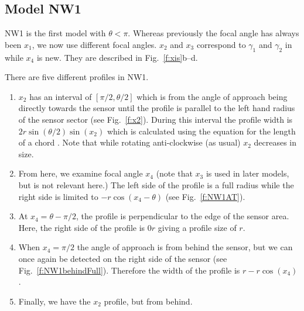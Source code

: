 \subsection{Model NW1} \label{NW1}

NW1 is the first model with $\theta < \pi$. Whereas previously the focal angle has always been $x_1$, we now use different focal angles. $x_2$ and $x_3$ correspond to $\gamma_1$ and $\gamma_2$ in \cite{rowcliffe2008estimating} while $x_4$ is new. They are described in Fig.~\ref{f:xis}b--d. 

There are five different profiles in NW1.
\begin{enumerate}
\item $x_2$ has an interval of $[\pi/2, \theta/2]$ which is from the angle of approach being directly towards the sensor until the profile is parallel to the left hand radius of the sensor sector (see Fig.~\ref{f:x2}). During this interval the profile width is $2r\sin\left(\theta/2\right)\sin(x_2)$ which is calculated using the equation for the length of a chord . Note that while rotating anti-clockwise (as usual) $x_2$ decreases in size.
\item From here, we examine focal angle $x_4$ (note that $x_3$ is used in later models, but is not relevant here.)  The left side of the profile is a full radius while the right side is limited to $- r\cos(x_4 - \theta)$ (see Fig.~\ref{f:NW1AT}).
\item At $x_4 =  \theta - \pi/2$, the profile is perpendicular to the edge of the sensor area. Here, the right side of the profile is $0r$ giving a profile size of $r$.   %
\item When $x_4 = \pi/2$ the angle of approach is from behind the sensor, but we can once again be detected on the right side of the sensor (see Fig.~\ref{f:NW1behindFull}). Therefore the width of the profile is $r - r\cos(x_4)$.
\item  Finally, we have the $x_2$ profile, but from behind. 
\end{enumerate}





